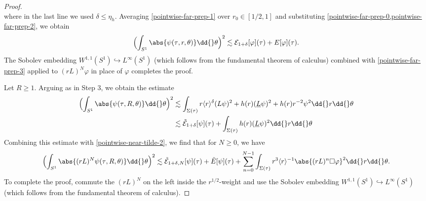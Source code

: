 \documentclass[10pt, reqno]{amsart}
\begin{document}
\begin{proof}
\begin{equation}
\end{equation}
where in the last line we used \(\delta{} \le \eta_h\). Averaging \cref{pointwise-far-prep-1}
over \(r_0\in [1/2,1]\) and substituting
\cref{pointwise-far-prep-0,pointwise-far-prep-2}, we obtain
\begin{equation}\label{pointwise-far-prep-3}
\Bigl(\int _{S^1}\abs{\psi{}(\tau{},r,\theta{})}\dd{}\theta{} \Bigr)^2\lesssim \mathcal{E}_{1+\delta{}}[\varphi{}](\tau{}) + E[\varphi{}](\tau{}).
\end{equation}
The Sobolev embedding \(W^{1,1}(S^1)\hookrightarrow{}L^\infty(S^1)\) (which follows from the
fundamental theorem of calculus) combined with \cref{pointwise-far-prep-3} applied
to \((rL)^N\varphi{}\) in place of \(\varphi{}\) completes the proof.

 Let \(R\ge 1\). Arguing as in Step 3, we
obtain the estimate
\begin{equation}
\begin{split}
\Bigl(\int _{S^1}\abs{\psi{}(\tau{},R,\theta{})}\dd{}\theta{}\Bigr)^2 &\lesssim \int _{\Sigma{}(\tau{})} r\langle{}r\rangle^\delta{}(L\psi{})^2 + h(r)(\underline{L}\psi{})^2 + h(r)r^{-2}\psi^2\dd{}r\dd{}\theta{}\\
&\lesssim \tilde{\mathcal{E}}_{1+\delta{}}[\psi{}](\tau{}) + \int _{\Sigma{}(\tau{})} h(r)(\underline{L}\psi{})^2\dd{}r\dd{}\theta{}
\end{split}
\end{equation}
Combining this estimate with \cref{pointwise-near-tilde-2}, we find that for \(N\ge
0\), we have
\begin{equation}
\Bigl(\int _{S^1}\abs{(rL)^N\psi{}(\tau{},R,\theta{})}\dd{}\theta{}\Bigr)^2\lesssim \tilde{\mathcal{E}}_{1+\delta{},N}[\psi{}](\tau{}) + \tilde{E}[\psi{}](\tau{}) + \sum_{n=0}^{N-1}  \int _{\Sigma{}(\tau{})} r^3\langle{}r\rangle{}^{-1}\abs{(rL)^n\Box{}\varphi{}}^2\dd{}r\dd{}\theta{}.
\end{equation}
To complete the proof, commute the \((rL)^N\) on the left inside the
\(r^{1/2}\)-weight and use the Sobolev embedding
\(W^{1,1}(S^1)\hookrightarrow{}L^\infty(S^1)\) (which follows from the
fundamental theorem of calculus).
\end{proof}
\end{document}
